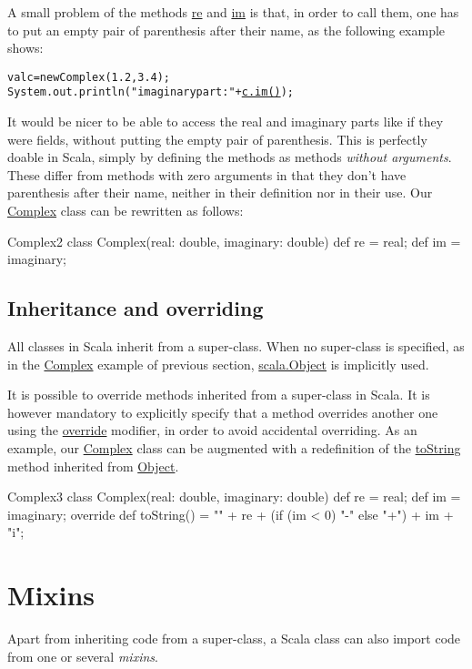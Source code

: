 \documentclass[a4paper,12pt]{article}
\newcommand{\langname}[1]{#1\xspace}
\newcommand{\Scala}{\langname{Scala}}
\newcommand{\ident}[1]{\url{#1}\xspace}
\begin{document}
A small problem of the methods \ident{re} and \ident{im} is that, in
order to call them, one has to put an empty pair of parenthesis after
their name, as the following example shows:
\begin{alltt}
val c = new Complex(1.2, 3.4);
System.out.println("imaginary part: " + \underline{c.im()});
\end{alltt}
It would be nicer to be able to access the real and imaginary parts
like if they were fields, without putting the empty pair of
parenthesis. This is perfectly doable in \Scala, simply by defining
the methods as methods \emph{without arguments}. These differ from
methods with zero arguments in that they don't have parenthesis after
their name, neither in their definition nor in their use. Our
\ident{Complex} class can be rewritten as follows:
\begin{scalaprogram}{Complex2}
class Complex(real: double, imaginary: double) {
  def re = real;
  def im = imaginary;
}
\end{scalaprogram}

\subsection{Inheritance and overriding}
\label{sec:inheritance}

All classes in \Scala inherit from a super-class. When no super-class
is specified, as in the \ident{Complex} example of previous section,
\ident{scala.Object} is implicitly used.

It is possible to override methods inherited from a super-class in
\Scala. It is however mandatory to explicitly specify that a method
overrides another one using the \ident{override} modifier, in order to
avoid accidental overriding. As an example, our \ident{Complex} class
can be augmented with a redefinition of the \ident{toString} method
inherited from \ident{Object}.
\begin{scalaprogram}{Complex3}
class Complex(real: double, imaginary: double) {
  def re = real;
  def im = imaginary;
  override def toString() =
    "" + re + (if (im < 0) "-" else "+") + im + "i";
}
\end{scalaprogram}

\section{Mixins}
\label{sec:mixins}

Apart from inheriting code from a super-class, a \Scala class can also
import code from one or several \emph{mixins}.
\end{document}

